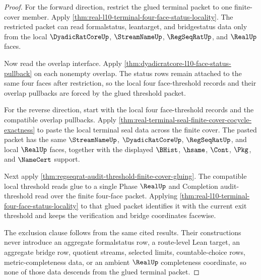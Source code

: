 \begin{proof}
For the forward direction, restrict the glued terminal packet to one finite-cover member. Apply \autoref{thm:real-l10-terminal-four-face-status-locality}. The restricted packet can read formalstatus, leantarget, and bridgestatus data only from the local $\DyadicRatCoreUp$, $\StreamNameUp$, $\RegSeqRatUp$, and $\RealUp$ faces.

Now read the overlap interface. Apply \autoref{thm:dyadicratcore-l10-face-status-pullback} on each nonempty overlap. The status rows remain attached to the same four faces after restriction, so the local four face-threshold records and their overlap pullbacks are forced by the glued threshold packet.

For the reverse direction, start with the local four face-threshold records and the compatible overlap pullbacks. Apply \autoref{thm:real-terminal-seal-finite-cover-cocycle-exactness} to paste the local terminal seal data across the finite cover. The pasted packet has the same $\StreamNameUp$, $\DyadicRatCoreUp$, $\RegSeqRatUp$, and local $\RealUp$ faces, together with the displayed $\BHist$, $\hsame$, $\Cont$, $\Pkg$, and $\NameCert$ support.

Next apply \autoref{thm:regseqrat-audit-threshold-finite-cover-gluing}. The compatible local threshold reads glue to a single Phase $\RealUp$ and Completion audit-threshold read over the finite four-face packet. Applying \autoref{thm:real-l10-terminal-four-face-status-locality} to that glued packet identifies it with the current exit threshold and keeps the verification and bridge coordinates facewise.

The exclusion clause follows from the same cited results. Their constructions never introduce an aggregate formalstatus row, a route-level Lean target, an aggregate bridge row, quotient streams, selected limits, countable-choice rows, metric-completeness data, or an ambient $\RealUp$ completeness coordinate, so none of those data descends from the glued terminal packet.
\end{proof}
